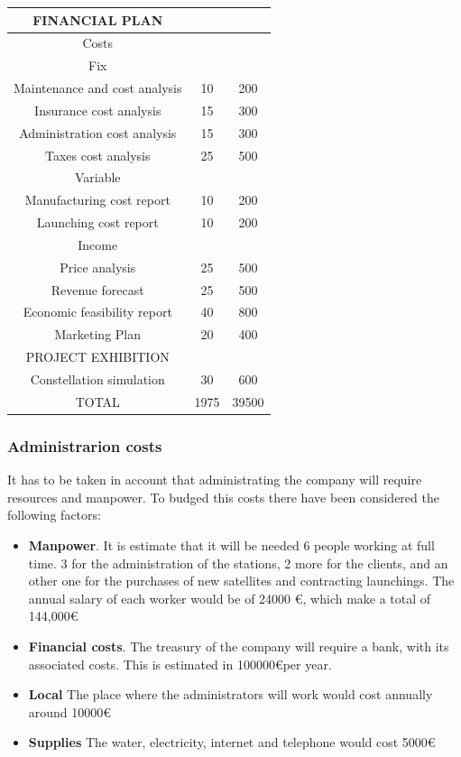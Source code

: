\begin{longtable}{ccc}
	FINANCIAL PLAN &  &  \\ \hline
	Costs &  &  \\ \hline
	Fix &  &  \\ \hline
	Maintenance and cost analysis & 10 & 200 \\ \hline
	Insurance cost analysis & 15 & 300 \\ \hline
	Administration cost analysis & 15 & 300 \\ \hline
	Taxes cost analysis & 25 & 500 \\ \hline
	Variable &  &  \\ \hline
	Manufacturing cost report & 10 & 200 \\ \hline
	Launching cost report & 10 & 200 \\ \hline
	Income &  &  \\ \hline
	Price analysis & 25 & 500 \\ \hline
	Revenue forecast & 25 & 500 \\ \hline
	Economic feasibility report & 40 & 800 \\ \hline
	Marketing Plan & 20 & 400 \\ \hline
	\rowcolor[gray]{0.85}
	PROJECT EXHIBITION &  &  \\ \hline
	Constellation simulation & 30 & 600 \\ \hline
	\rowcolor[gray]{0.65}
	TOTAL & 1975 & 39500 \\
	\bottomrule
\end{longtable}

\subsubsection{Administrarion costs}
It has to be taken in account that administrating the company will require resources and manpower. To budged this costs there have been considered the following factors:

\begin{itemize}
\item \textbf{Manpower}. It is estimate that it will be needed 6 people working at full time. 3 for the administration of the stations, 2 more for the clients, and an other one for the purchases of new satellites and contracting launchings. The annual salary of each worker would be of 24000 \euro, which make a total of 144,000\euro
\item \textbf{Financial costs}. The treasury of the company will require a  bank, with its associated costs. This is estimated in 100000\euro  per year.
\item \textbf{Local} The place where the administrators will work would cost annually around 10000\euro
\item \textbf{Supplies} The water, electricity, internet and telephone would cost 5000\euro
\end{itemize}

